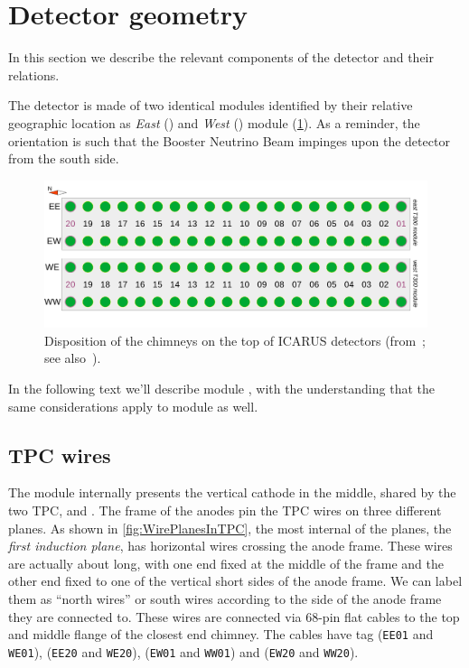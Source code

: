 \section{Detector geometry}
\label{sec:geometry}

In this section we describe the relevant components of the detector and their relations.

The detector is made of two identical modules
identified by their relative geographic location
as \emph{East} () and \emph{West} () module (\cref{fig:chimneys}).
As a reminder, the orientation is such that the Booster Neutrino Beam impinges
upon the detector from the south side.

\begin{figure}[bt] %
  \includegraphics[width=\textwidth]{figures/ChimneyMap}
  \caption{
    Disposition of the chimneys on the top of ICARUS detectors (from~\cite{SBNDocDB14316}; see also~\cite{SBNDocDBxxxx:ConnTest}).
    \label{fig:chimneys}
  }
\end{figure}

In the following text we'll describe module ,
with the understanding that the same considerations apply to module  as well.


\subsection{TPC wires}
\label{ssec:geometry:wires}

The module internally presents the vertical cathode in the middle, shared by
the two TPC,  and .
The frame of the anodes pin the TPC wires on three different planes.
As shown in \cref{fig:WirePlanesInTPC}, the most internal of the planes,
the \emph{first induction plane}, has horizontal wires crossing the anode frame.
These wires are actually about  long, with one end fixed at the middle
of the frame and the other end fixed to one of the vertical short sides of the anode frame.
We can label them as ``north wires'' or south wires
according to the side of the anode frame they are connected to.
These wires are connected via 68-pin flat cables to the top and middle flange
of the closest end chimney.
The cables have tag
 (\texttt{EE01} and \texttt{WE01}),
 (\texttt{EE20} and \texttt{WE20}),
 (\texttt{EW01} and \texttt{WW01})
and
 (\texttt{EW20} and \texttt{WW20}).

